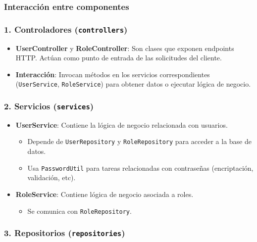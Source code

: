 \subsubsection{Interacción entre componentes}

\subsubsection*{1. Controladores (\texttt{controllers})}

\begin{itemize}
  \item \textbf{UserController} y \textbf{RoleController}: Son clases que exponen endpoints HTTP. Actúan como punto de entrada de las solicitudes del cliente.
  \item \textbf{Interacción}: Invocan métodos en los servicios correspondientes (\texttt{UserService}, \texttt{RoleService}) para obtener datos o ejecutar lógica de negocio.
\end{itemize}

\subsubsection*{2. Servicios (\texttt{services})}

\begin{itemize}
  \item \textbf{UserService}: Contiene la lógica de negocio relacionada con usuarios.
    \begin{itemize}
      \item Depende de \texttt{UserRepository} y \texttt{RoleRepository} para acceder a la base de datos.
      \item Usa \texttt{PasswordUtil} para tareas relacionadas con contraseñas (encriptación, validación, etc).
    \end{itemize}
  \item \textbf{RoleService}: Contiene lógica de negocio asociada a roles.
    \begin{itemize}
      \item Se comunica con \texttt{RoleRepository}.
    \end{itemize}
\end{itemize}

\subsubsection*{3. Repositorios (\texttt{repositories})}

